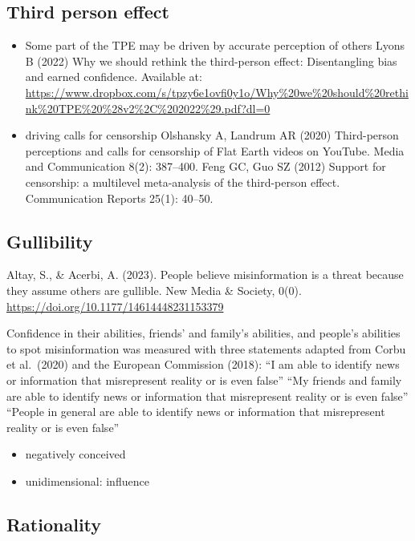 \documentclass[
  ,jou,floatsintext]{apa6}
\providecommand{\tightlist}{%
  \setlength{\itemsep}{0pt}\setlength{\parskip}{0pt}}
\begin{document}
\hypertarget{third-person-effect}{%
\subsection{Third person effect}\label{third-person-effect}}

\begin{itemize}
\item
  Some part of the TPE may be driven by accurate perception of others
  Lyons B (2022) Why we should rethink the third-person effect: Disentangling bias and earned confidence. Available at: \url{https://www.dropbox.com/s/tpzy6e1ovfi0y1o/Why\%20we\%20should\%20rethink\%20TPE\%20\%28v2\%2C\%202022\%29.pdf?dl=0}
\item
  driving calls for censorship
  Olshansky A, Landrum AR (2020) Third-person perceptions and calls for censorship of Flat Earth videos on YouTube. Media and Communication 8(2): 387--400.
  Feng GC, Guo SZ (2012) Support for censorship: a multilevel meta-analysis of the third-person effect. Communication Reports 25(1): 40--50.
\end{itemize}

\hypertarget{gullibility}{%
\subsection{Gullibility}\label{gullibility}}

Altay, S., \& Acerbi, A. (2023). People believe misinformation is a threat because they assume others are gullible. New Media \& Society, 0(0). \url{https://doi.org/10.1177/14614448231153379}

Confidence in their abilities, friends' and family's abilities, and people's abilities to spot misinformation was measured with three statements adapted from Corbu et al.~(2020) and the European Commission (2018):
``I am able to identify news or information that misrepresent reality or is even false''
``My friends and family are able to identify news or information that misrepresent reality or is even false''
``People in general are able to identify news or information that misrepresent reality or is even false''

\begin{itemize}
\tightlist
\item
  negatively conceived
\item
  unidimensional: influence
\end{itemize}

\hypertarget{rationality}{%
\subsection{Rationality}\label{rationality}}
\end{document}
